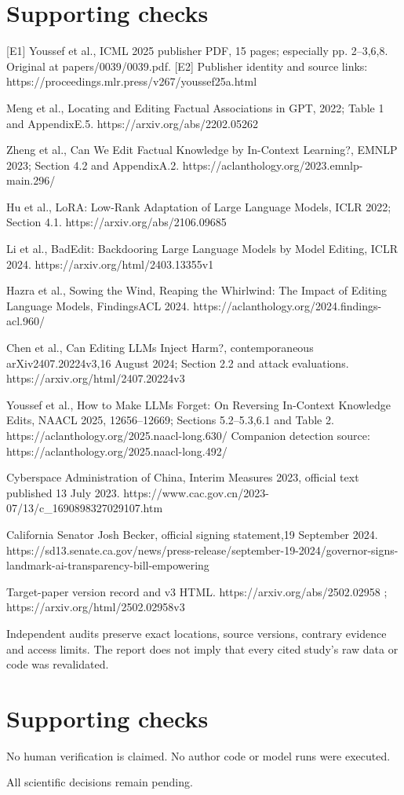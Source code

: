 \documentclass[10pt]{article}
\begin{document}
\section*{Supporting checks}
[E1] Youssef et al., ICML 2025 publisher PDF, 15 pages; especially pp. 2–3,6,8. Original at papers/0039/0039.pdf. [E2] Publisher identity and source links: https://proceedings.mlr.press/v267/youssef25a.html\par
[E3] Meng et al., Locating and Editing Factual Associations in GPT, 2022; Table 1 and AppendixE.5. https://arxiv.org/abs/2202.05262\par
[E4] Zheng et al., Can We Edit Factual Knowledge by In-Context Learning?, EMNLP 2023; Section 4.2 and AppendixA.2. https://aclanthology.org/2023.emnlp-main.296/\par
[E5] Hu et al., LoRA: Low-Rank Adaptation of Large Language Models, ICLR 2022; Section 4.1. https://arxiv.org/abs/2106.09685\par
[E6] Li et al., BadEdit: Backdooring Large Language Models by Model Editing, ICLR 2024. https://arxiv.org/html/2403.13355v1\par
[E7] Hazra et al., Sowing the Wind, Reaping the Whirlwind: The Impact of Editing Language Models, FindingsACL 2024. https://aclanthology.org/2024.findings-acl.960/\par
[E8] Chen et al., Can Editing LLMs Inject Harm?, contemporaneous arXiv2407.20224v3,16 August 2024; Section 2.2 and attack evaluations. https://arxiv.org/html/2407.20224v3\par
[E9] Youssef et al., How to Make LLMs Forget: On Reversing In-Context Knowledge Edits, NAACL 2025, 12656–12669; Sections 5.2–5.3,6.1 and Table 2. https://aclanthology.org/2025.naacl-long.630/ Companion detection source: https://aclanthology.org/2025.naacl-long.492/\par
[E10] Cyberspace Administration of China, Interim Measures 2023, official text published 13 July 2023. https://www.cac.gov.cn/2023-07/13/c\_1690898327029107.htm\par
[E11] California Senator Josh Becker, official signing statement,19 September 2024. https://sd13.senate.ca.gov/news/press-release/september-19-2024/governor-signs-landmark-ai-transparency-bill-empowering\par
[E12] Target-paper version record and v3 HTML. https://arxiv.org/abs/2502.02958 ; https://arxiv.org/html/2502.02958v3\par
Independent audits preserve exact locations, source versions, contrary evidence and access limits. The report does not imply that every cited study’s raw data or code was revalidated.\par
\section*{Supporting checks}
No human verification is claimed. No author code or model runs were executed.\par
All scientific decisions remain pending.\par
\end{document}
